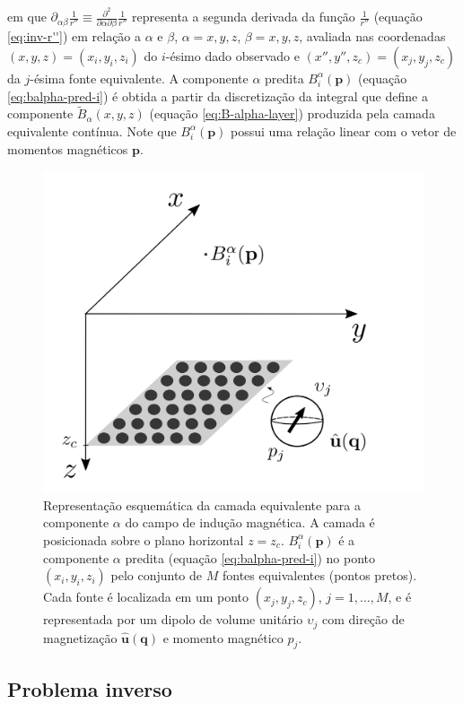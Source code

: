 em que $\partial_{\alpha\beta} \frac{1}{r''} \equiv \frac{\partial^{2}}{\partial \alpha \partial \beta} \frac{1}{r''}$ 
representa a segunda derivada da função $\frac{1}{r''}$ (equação \ref{eq:inv-r''}) em relação a $\alpha$ e $\beta$, 
$\alpha = x, y, z$, $\beta = x, y, z$, avaliada nas coordenadas $(x, y, z) = (x_{i}, y_{i}, z_{i})$ do $i$-ésimo dado  
observado e $(x'', y'', z_{c}) = (x_{j}, y_{j}, z_{c})$ da $j$-ésima fonte equivalente.
A componente $\alpha$ predita $B^{\alpha}_{i} (\mathbf{p})$ (equação \ref{eq:balpha-pred-i}) é 
obtida a partir da discretização da integral que define a componente $\tilde{B}_{\alpha}(x, y, z)$
(equação \ref{eq:B-alpha-layer}) produzida pela camada equivalente contínua.
Note que $B^{\alpha}_{i}(\mathbf{p})$ possui uma relação linear com o vetor de momentos 
magnéticos $\mathbf{p}$.

\begin{figure}[H]
	\centering
	\includegraphics[width=.7\textwidth]{Fig/mag_vec/eqlayer_figure_balpha.png}
	\caption{Representação esquemática da camada equivalente para a componente $\alpha$ do campo de 
	indução magnética. A camada é posicionada sobre o plano horizontal $z = z_{c}$. 
	$B^{\alpha}_{i}(\mathbf{p})$ é a componente $\alpha$ predita (equação \ref{eq:balpha-pred-i}) no 
	ponto $(x_{i},y_{i},z_{i})$ pelo conjunto de $M$ fontes equivalentes (pontos pretos). 
	Cada fonte é localizada em um ponto  $(x_{j},y_{j},z_{c})$, 
	$j = 1,\hdots, M$, e é representada por um dipolo de volume unitário $\upsilon_{j}$ 
	com direção de magnetização $\hat{\mathbf{u}}(\mathbf{q})$ e momento magnético $p_{j}$.}
	\label{fig:eqlayer_balpha_sketch}
\end{figure}

\subsection{Problema inverso}
\label{subsec:balpha_prob_inv}

